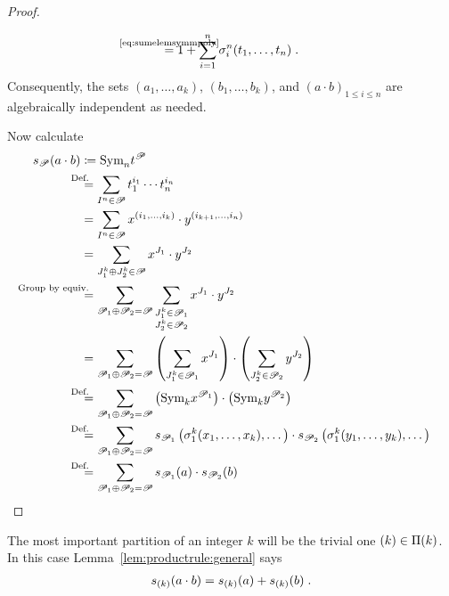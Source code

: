 \begin{Lem}
\begin{proof}
\begin{itemize}
\begin{align*}
            \cequalsby{\eqref{eq:sumelemsymmpoly}}
            1 + \sum_{i=1}^n \el i n (t_1,\dotsc,t_n)
            \;.
      \end{align*}
      Consequently, the sets 
      $(a_1,\dotsc,a_k)$, $(b_1,\dotsc,b_k)$, and
      $(a\cdot b)_{1\leq i\leq n}$ are algebraically independent as
      needed.
    \end{itemize}
    Now calculate
    \begin{align*}
      \s{\Part}(a\cdot b)
      &\coloneqq
        \symm{n} t^{\Part}
      \\ &\equalsby{Def.}
           \sum_{I^n\in\Part}
           t_1^{i_1}\dotsm t_n^{i_n}
      \\ &=
           \sum_{I^n\in\Part}
           x^{(i_1,\dotsc,i_k)}\cdot y^{(i_{k+1},\dotsc,i_n)}
      \\ &=
           \sum_{J_1^k\concat J_2^k\in\Part}
           x^{J_1} \cdot y^{J_2}
      \\ &\equalsby{Group by equiv.}
           \sum_{\Part_1\concat \Part_2=\Part}
           \sum_{\substack{J_1^k\in\Part_1\\ J_2^k\in\Part_2}}
      x^{J_1} \cdot y^{J_2}
      \\ &=
           \sum_{\Part_1\concat \Part_2=\Part}
           \left(\sum_{J_1^k\in\Part_1} x^{J_1}\right)
           \cdot
           \left(\sum_{J_2^k\in\Part_2} y^{J_2}\right)
      \\ &\equalsby{Def.}
           \sum_{\Part_1\concat \Part_2=\Part}
           \left(\symm{k} x^{\Part_1}\right)
           \cdot
           \left(\symm{k} y^{\Part_2}\right)
      \\ &\equalsby{Def.}
           \sum_{\Part_1\concat \Part_2=\Part}
           \s{\Part_1}\left( \el 1 k(x_1,\dotsc,x_k),\dotsc \right)
           \cdot
           \s{\Part_2}\left( \el 1 k(y_1,\dotsc,y_k),\dotsc \right)
      \\ &\equalsby{Def.}
           \sum_{\Part_1\concat \Part_2=\Part}
           \s{\Part_1}(a) \cdot \s{\Part_2}(b)
           \qedhere
    \end{align*}
  \end{proof}
\end{Lem}

\begin{Ex}
  The most important partition of an integer $k$ will be the trivial
  one $(k)\in\Pi({k})$. In this case
  Lemma~\autoref{lem:productrule:general} says
  \begin{gather*}
    s_{(k)}(a\cdot b) = s_{(k)}(a) + s_{(k)}(b)
    \;.
  \end{gather*}
\end{Ex}


